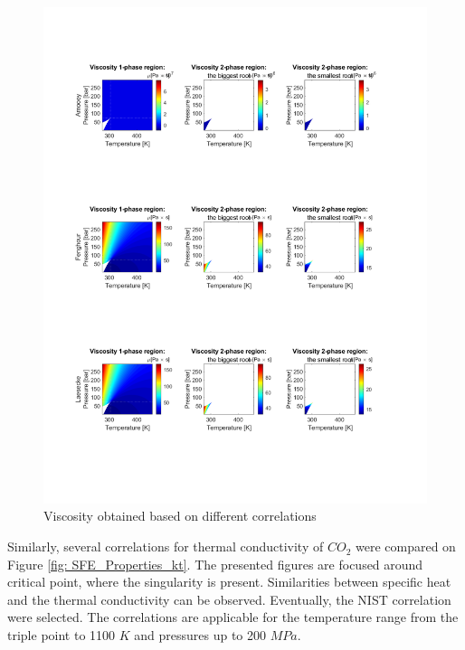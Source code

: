 \documentclass[../Article_Model_Parameters.tex]{subfiles}
\begin{document}
        \begin{figure}[H]
			\centering
			\includegraphics[trim = 1.5cm 4.0cm 2.5cm 10.0cm,clip,width=\textwidth]{Figures/MU.pdf}	
			\caption{Viscosity obtained based on different correlations}
            \label{fig: SFE_Properties_mu}
		\end{figure}

        Similarly, several correlations for thermal conductivity of $CO_2$ were compared on Figure
        \ref{fig: SFE_Properties_kt}. The presented figures are focused around critical point, where the singularity is present. Similarities between specific heat and the thermal conductivity can be observed. Eventually, the NIST correlation were selected. The correlations are applicable for the temperature range from the triple point to 1100 $K$ and pressures up to 200 $MPa$.
\end{document}
